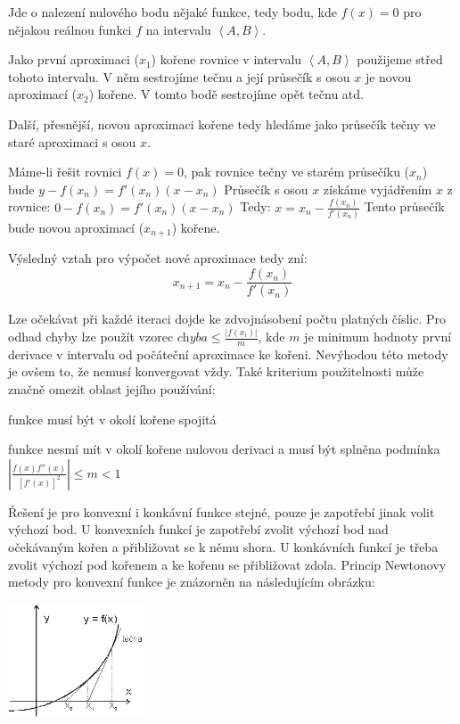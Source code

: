 Jde o nalezení nulového bodu nějaké funkce, tedy bodu, kde $f(x) = 0$ pro nějakou reálnou funkci $f$ na intervalu $\left<A,B\right>$.

Jako první aproximaci ($x_1$) kořene rovnice v intervalu $\left<A,B\right>$ použijeme střed tohoto intervalu. V něm sestrojíme tečnu a její průsečík s osou $x$ je novou aproximací ($x_2$) kořene. V tomto bodě sestrojíme opět tečnu atd.

Další, přesnější, novou aproximaci kořene tedy hledáme jako průsečík tečny ve staré aproximaci s osou $x$.

Máme-li řešit rovnici $f(x) = 0$, pak rovnice tečny ve starém průsečíku ($x_n$) bude $y - f(x_n) = f'(x_n)(x - x_n)$
Průsečík s osou $x$ získáme vyjádřením $x$ z rovnice: $0 - f(x_n) = f'(x_n)(x - x_n)$ Tedy: $x = x_n - \frac{f(x_n)}{f'(x_n)}$
Tento průsečík bude novou aproximací ($x_{n+1}$) kořene.

Výsledný vztah pro výpočet nové aproximace tedy zní: 
$$x_{n+1} = x_n - \frac{f(x_n)}{f'(x_n)}$$

Lze očekávat při každé iteraci dojde ke zdvojnásobení počtu platných číslic. Pro odhad chyby lze použít vzorec $\textit{chyba} \le \frac{|f(x_i)|}{m}$, kde $m$ je minimum hodnoty první derivace v intervalu od počáteční aproximace ke kořeni. Nevýhodou této metody je ovšem to, že nemusí konvergovat vždy. Také kriterium použitelnosti může značně omezit oblast jejího používání:
\begin{pitemize}
	\item funkce musí být v okolí kořene spojitá
	\item funkce nesmí mít v okolí kořene nulovou derivaci a musí být splněna podmínka $\left|\frac{f(x)f''(x)}{[f'(x)]^2}\right| \le m < 1$
\end{pitemize}

Řešení je pro konvexní i konkávní funkce stejné, pouze je zapotřebí jinak volit výchozí bod. U konvexních funkcí je zapotřebí zvolit výchozí bod nad očekávaným kořen a přibližovat se k němu shora. U konkávních funkcí je třeba zvolit výchozí pod kořenem a ke kořenu se přibližovat zdola. Princip Newtonovy metody pro konvexní funkce je znázorněn na následujícím obrázku:

\begin{center} \includegraphics[width=4cm]{matematika/obrazky/newton.png} \end{center}
